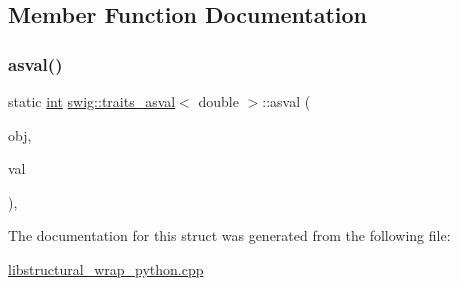 \subsection{Member Function Documentation}
\mbox{\label{structswig_1_1traits__asval_3_01double_01_4_aa2b3a8491625ce70a1bb03c1cc851d9a}} 
\subsubsection{\texorpdfstring{asval()}{asval()}}
{\footnotesize\ttfamily static \hyperlink{lp__lib_8h_adeb9ec6400320e4923ac9d836d509ddb}{int} \hyperlink{structswig_1_1traits__asval}{swig\+::traits\+\_\+asval}$<$ double $>$\+::asval (\begin{DoxyParamCaption}\item[{Py\+Object $\ast$}]{obj,  }\item[{\hyperlink{structswig_1_1traits__asval_3_01double_01_4_acc549718ce52880c4368a2e37f3ff544}{value\+\_\+type} $\ast$}]{val }\end{DoxyParamCaption})\hspace{0.3cm}{\ttfamily [inline]}, {\ttfamily [static]}}



The documentation for this struct was generated from the following file\+:\begin{DoxyCompactItemize}
\item 
\hyperlink{libstructural__wrap__python_8cpp}{libstructural\+\_\+wrap\+\_\+python.\+cpp}\end{DoxyCompactItemize}
